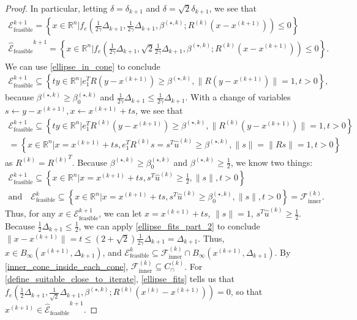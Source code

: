 \documentclass{article}
\theoremstyle{case}
\numberwithin{theorem}{subsection}
\newcommand{\bs}{{\beta^{(\star, k)}}}
\newcommand{\bsk}{{\beta_0^{(\star, k)}}}
\newcommand{\capcones}{{C^{(k)}_{\cap}}}
\newcommand{\dkpo}{\Delta_{k+1}}
\newcommand{\fcki}{{\mathcal {F}^{(k)}_{\textrm{inner}}}}
\newcommand{\huk}{{{\hat u}^{(k)}}}
\newcommand{\Rn}{\mathbb R^n}
\newcommand{\rotk}{{R^{(k)}}}
\newcommand{\trkpo}{{ B_{\infty}\left(\xkpo, \dkpo\right) }}
\newcommand{\unshiftedellipsoid}{{\mathcal E^k_{\textrm{feasible}}}}
\newcommand{\xkpo}{{{x}^{(k+1)}}}
\newcommand{\xk}{{x^{(k)}}}
\newcommand{\sdkpo}{{\delta_{k+1}}}
\newcommand{\unshiftedellipsoidpo}{{\mathcal E^{k+1}_{\textrm{feasible}}}}
\newcommand{\scaledunshiftedellipsoidpo}{{{\mathcal {\hat E}_{\text{feasible}}}^{k+1}}}
\begin{document}
\begin{proof}
In particular, letting $\delta = \sdkpo$ and $\delta = \sqrt{2}\sdkpo$, we see that
\begin{align*}
\unshiftedellipsoidpo = \left\{x \in \Rn | f_e\left(\frac 1 {2\gamma} \dkpo, \frac 1 {2\gamma} \dkpo, \bs; \rotk\left(x - \xkpo\right)\right) \le 0 \right\} \\
\scaledunshiftedellipsoidpo = \left\{x \in \Rn | f_e\left(\frac 1 {2\gamma} \dkpo, \sqrt{2} \frac {1}{2\gamma}\dkpo, \bs; \rotk\left(x - \xkpo\right)\right) \le 0 \right\}.
\end{align*}
We can use \cref{ellipse_in_cone} to conclude
\begin{align*}
\unshiftedellipsoidpo \subseteq \left\{t y \in \Rn | e_1^TR\left(y - \xkpo\right) \ge \bs, \|R\left(y - \xkpo\right)\| = 1, t > 0 \right\},
\end{align*}
because $\bs \ge \bsk$ and $\frac 1 {2\gamma} \dkpo \le \frac 1 {2\gamma} \dkpo$.
With a change of variables $s \gets y - \xkpo, x \gets \xkpo + t s$, we see that
\begin{align*}
\unshiftedellipsoidpo \subseteq \left\{t y \in \Rn | e_1^T\rotk\left(y - \xkpo\right) \ge \bs, \|\rotk\left(y - \xkpo\right)\| = 1, t > 0 \right\} \\
= \left\{x \in \Rn | x = \xkpo + ts, e_1^T\rotk s = s^T\huk \ge \bs, \|s\| = \|Rs\| = 1, t > 0 \right\}
\end{align*}
as $\rotk = \rotk^T$.
Because $\bs \ge \bsk$ and $\bs \ge \frac 1 2$, we know two things:
\begin{align*}
\unshiftedellipsoidpo \subseteq \left\{x \in \Rn | x = \xkpo + ts, s^T\huk \ge \frac 1 2, \|s\|, t > 0 \right\} \\
\textrm{and} \quad \unshiftedellipsoid \subseteq \left\{x \in \Rn | x = \xkpo + ts, s^T\huk \ge \bsk, \|s\|, t > 0 \right\} = \fcki.
\end{align*}
Thus, for any $x \in \unshiftedellipsoidpo$, we can let $x = \xkpo + ts$, $\|s\| = 1$, $s^T\huk \ge \frac 1 2$.
Because $\frac 1 2 \dkpo \le \frac 1 2$, we can apply \cref{ellipse_fits_part_2} to conclude $\|x - \xkpo\| = t \le \left(2 + \sqrt{2}\right)\frac 1 {2\gamma} \dkpo = \dkpo$.
Thus, $x \in \trkpo$, and $\unshiftedellipsoid \subseteq \fcki \cap \trkpo$.
By \cref{inner_cone_inside_each_cone}, $\fcki \subseteq \capcones$.
For \cref{define_suitable_close_to_iterate}, \cref{ellipse_fits} tells us that
$f_e\left(\frac 1 2 \dkpo, \frac 1 {\sqrt{2}}\dkpo, \bs; \rotk\left(\xk - \xkpo\right)\right) = 0$, so that $\xkpo \in \scaledunshiftedellipsoidpo$.
\end{proof}
\end{document}
